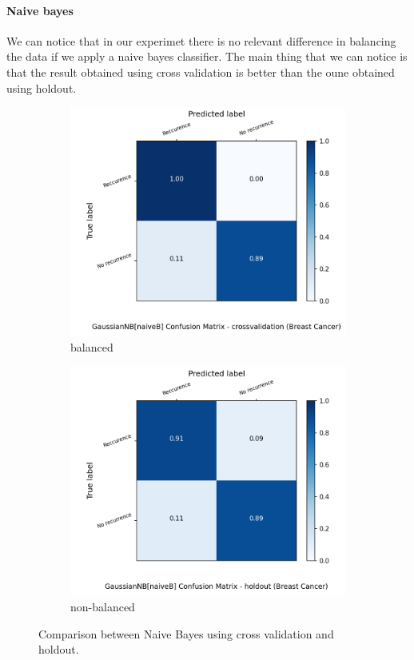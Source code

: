 \documentclass{article}
\begin{document}
\paragraph{Naive bayes}
We can notice that in our experimet there is no relevant difference in balancing the data if we apply a naive bayes classifier.
The main thing that we can notice is that the result obtained using cross validation is better than the oune obtained using holdout.


\begin{figure}[H]
	\centering
	\begin{subfigure}{.5\textwidth}
		\centering
		\includegraphics[width=1.1\textwidth]{Plots/breastCancer_GaussianNB_naiveB_balance_True_crossvalidation.png}
		\caption{balanced}
	\end{subfigure}%
	\begin{subfigure}{.5\textwidth}
		\centering
		\includegraphics[width=1.1\textwidth]{Plots/breastCancer_GaussianNB_naiveB_balance_True_holdout.png}
		\caption{non-balanced}
	\end{subfigure}
	\caption{{\color{red} Comparison between Naive Bayes using cross validation and holdout.}}
\end{figure}
\end{document}
